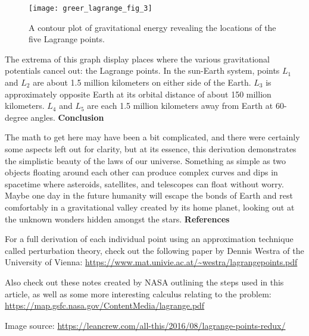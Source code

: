 \renewcommand{\thefigure}{3}
\begin{figure}[h]
  \begin{center}
    \texttt{[image: greer\_lagrange\_fig\_3]}
  \end{center}
  \caption{A contour plot of gravitational energy revealing the locations of the five Lagrange points.}
  \label{fig:3}
\end{figure}

The extrema of this graph display places where the various gravitational potentials cancel out: the Lagrange points. In the sun-Earth system, points $L_1$ and $L_2$ are about 1.5 million kilometers on either side of the Earth. $L_3$ is approximately opposite Earth at its orbital distance of about 150 million kilometers. $L_4$ and $L_5$ are each 1.5 million kilometers away from Earth at 60-degree angles.
\newline\newline
\textbf{Conclusion}

The math to get here may have been a bit complicated, and there were certainly some aspects left out for clarity, but at its essence, this derivation demonstrates the simplistic beauty of the laws of our universe. Something as simple as two objects floating around each other can produce complex curves and dips in spacetime where asteroids, satellites, and telescopes can float without worry. Maybe one day in the future humanity will escape the bonds of Earth and rest comfortably in a gravitational valley created by its home planet, looking out at the unknown wonders hidden amongst the stars. 
\newline\newline
\textbf{References}

For a full derivation of each individual point using an approximation technique called perturbation theory, check out the following paper by Dennis Westra of the University of Vienna: 
\newline\url{https://www.mat.univie.ac.at/~westra/lagrangepoints.pdf}

Also check out these notes created by NASA outlining the steps used in this article, as well as some more interesting calculus relating to the problem:
\newline\url{https://map.gsfc.nasa.gov/ContentMedia/lagrange.pdf}

Image source: 
\newline\url{https://leancrew.com/all-this/2016/08/lagrange-points-redux/}